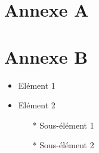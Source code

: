 \documentclass{article}
\begin{document}

                                   
\part{Annexe A}



\part{Annexe B}

\begin{itemize}                                            
  \item Elément 1                                           
  \item Elément 2                                           
  \begin{itemize}                                      
    \item[*] Sous-élément 1                              
    \item[*] Sous-élément 2                                     
  \end{itemize}                                     
\end{itemize}
\end{document}

